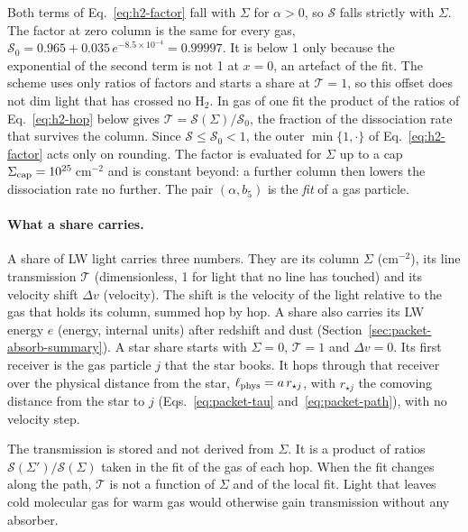 Both terms of Eq.~\eqref{eq:h2-factor} fall with $\Sigma$ for $\alpha>0$, so
$\mathcal S$ falls strictly with $\Sigma$. The factor at zero column is the
same for every gas, $\mathcal S_0=0.965+0.035\,e^{-8.5\times10^{-4}}=0.99997$.
It is below 1 only because the exponential of the second term is not 1 at
$x=0$, an artefact of the fit. The scheme uses only ratios of factors and
starts a share at $\mathcal T=1$, so this offset does not dim light that has
crossed no H$_2$. In gas of one fit the product of the ratios of
Eq.~\eqref{eq:h2-hop} below gives $\mathcal T=\mathcal S(\Sigma)/\mathcal S_0$,
the fraction of the dissociation rate that survives the column.
Since $\mathcal S\le\mathcal S_0<1$, the outer
$\min\{1,\cdot\}$ of Eq.~\eqref{eq:h2-factor} acts only on rounding. The
factor is evaluated for $\Sigma$ up to a cap $\Sigma_{\rm cap}=10^{25}$\,cm$^{-2}$
and is constant beyond: a further column then lowers the dissociation rate no
further. The pair
$(\alpha,b_5)$ is the \emph{fit} of a gas particle.

\paragraph{What a share carries.} A share of LW light carries three numbers.
They are its column $\Sigma$ (cm$^{-2}$), its line transmission $\mathcal T$
(dimensionless, 1 for light that no line has touched) and its velocity shift
$\Delta v$ (velocity). The shift is the velocity of the light relative to the
gas that holds its column, summed hop by hop. A share also carries its LW
energy $e$ (energy, internal units) after redshift and dust
(Section~\ref{sec:packet-absorb-summary}). A star share starts with
$\Sigma=0$, $\mathcal T=1$ and $\Delta v=0$. Its first receiver is the gas
particle $j$ that the star books. It hops through that receiver over the
physical distance from the star, $\ell_{\rm phys}=a\,r_{\star j}$, with
$r_{\star j}$ the comoving distance from the star to $j$
(Eqs.~\eqref{eq:packet-tau} and~\eqref{eq:packet-path}), with no velocity
step.

The transmission is stored and not derived from $\Sigma$. It is a product of
ratios $\mathcal S(\Sigma')/\mathcal S(\Sigma)$ taken in the fit of the gas of
each hop. When the fit changes along the path, $\mathcal T$ is not a function
of $\Sigma$ and of the local fit. Light that leaves cold molecular gas
for warm gas would otherwise gain transmission without any absorber.

